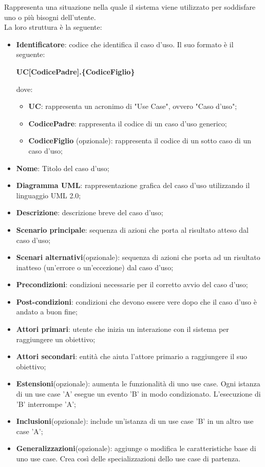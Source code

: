 Rappresenta una situazione nella quale il sistema viene utilizzato per soddisfare uno o più bisogni dell'utente.\\
La loro struttura è la seguente:
\begin{itemize}
\item \textbf{Identificatore}: codice che identifica il caso d'uso. Il suo formato è il seguente:
\begin{center}
\textbf{UC[CodicePadre].\{CodiceFiglio\}}\\
\end{center}
dove:
\begin{itemize}
\item \textbf{UC}: rappresenta un acronimo di "Use Case", ovvero "Caso d'uso";
\item \textbf{CodicePadre}: rappresenta il codice di un caso d'uso generico;
\item \textbf{CodiceFiglio} (opzionale): rappresenta il codice di un sotto caso di un caso d'uso;
\end{itemize}
\item \textbf{Nome}: Titolo del caso d'uso;
\item \textbf{Diagramma UML}: rappresentazione grafica del caso d'uso utilizzando il linguaggio UML 2.0; 
\item \textbf{Descrizione}: descrizione breve del caso d'uso;
\item \textbf{Scenario principale}: sequenza di azioni che porta al risultato atteso dal caso d'uso;
\item \textbf{Scenari alternativi}(opzionale): sequenza di azioni che porta ad un risultato inatteso (un'errore o un'eccezione) dal caso d'uso;
\item \textbf{Precondizioni}: condizioni necessarie per il corretto avvio del caso d'uso;
\item \textbf{Post-condizioni}: condizioni che devono essere vere dopo che il caso d'uso è andato a buon fine;
\item \textbf{Attori primari}: utente che inizia un interazione con il sistema per raggiungere un obiettivo;
\item \textbf{Attori secondari}: entità che aiuta l'attore primario a raggiungere il suo obiettivo;
\item \textbf{Estensioni}(opzionale): aumenta le funzionalità di uno use case. Ogni istanza di un use case 'A' esegue un evento 'B' in modo condizionato. L'esecuzione di 'B' interrompe 'A';
\item \textbf{Inclusioni}(opzionale): include un'istanza di un use case 'B' in un altro use case 'A';
\item \textbf{Generalizzazioni}(opzionale): aggiunge o modifica le caratteristiche base di uno use case. Crea così delle specializzazioni dello use case di partenza.
\end{itemize}